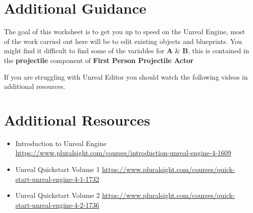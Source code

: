 \documentclass{../../../fal_assignment}
\begin{document}
\section*{Additional Guidance}

The goal of this worksheet is to get you up to speed on the Unreal Engine, most of the work carried out here will be to edit existing objects and blueprints.
You might find it difficult to find some of the variables for \textbf{A} \& \textbf{B}, this is contained in the \textbf{projectile} component
of \textbf{First Person Projectile Actor}

If you are struggling with Unreal Editor you should watch the following videos in additional resources.

\section*{Additional Resources}

\begin{itemize}
    \item Introduction to Unreal Engine \url{https://www.pluralsight.com/courses/introduction-unreal-engine-4-1609}
    \item Unreal Quickstart Volume 1 \url{https://www.pluralsight.com/courses/quick-start-unreal-engine-4-1-1732}
    \item Unreal Quickstart Volume 2 \url{https://www.pluralsight.com/courses/quick-start-unreal-engine-4-2-1736}
\end{itemize}
\end{document}
